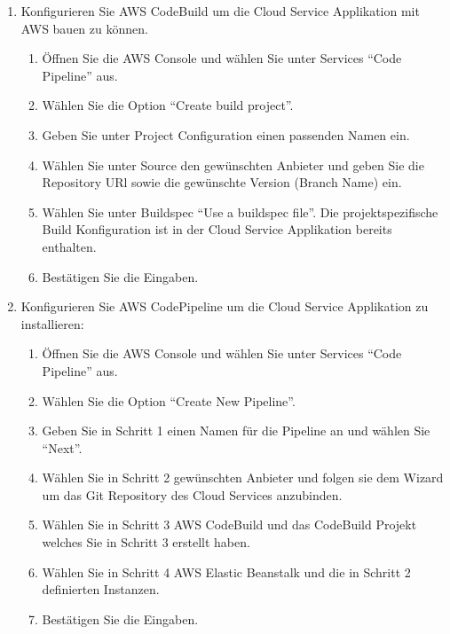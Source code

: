 \begin{enumerate}
\begin{enumerate}
        \item Name: FCM\_CREDENTIALS, Wert: Firebase Credentials mit Base 64 Encoded\footnote{Siehe Installationsanleitung Firebase Messaging}
        \item Name: SPRING\_PROFILES\_ACTIVE, Wert: aws.
    \end{enumerate}
    \item Konfigurieren Sie AWS CodeBuild um die Cloud Service Applikation mit AWS bauen zu können.
    \begin{enumerate}
        \item Öffnen Sie die AWS Console und wählen Sie unter Services ``Code Pipeline'' aus.
        \item Wählen Sie die Option ``Create build project''.
        \item Geben Sie unter Project Configuration einen passenden Namen ein.
        \item Wählen Sie unter Source den gewünschten Anbieter und geben Sie die Repository URl sowie die gewünschte Version (Branch Name) ein.
        \item Wählen Sie unter Buildspec ``Use a buildspec file''. Die projektspezifische Build Konfiguration ist in der Cloud Service Applikation bereits enthalten.
        \item Bestätigen Sie die Eingaben.
    \end{enumerate}
    \item Konfigurieren Sie AWS CodePipeline um die Cloud Service Applikation zu installieren:
    \begin{enumerate}
        \item Öffnen Sie die AWS Console und wählen Sie unter Services ``Code Pipeline'' aus.
        \item Wählen Sie die Option ``Create New Pipeline''.
        \item Geben Sie in Schritt 1 einen Namen für die Pipeline an und wählen Sie ``Next''.
        \item Wählen Sie in Schritt 2 gewünschten Anbieter und folgen sie dem Wizard um das Git Repository des Cloud Services anzubinden.
        \item Wählen Sie in Schritt 3 AWS CodeBuild und das CodeBuild Projekt welches Sie in Schritt 3 erstellt haben.
        \item Wählen Sie in Schritt 4 AWS Elastic Beanstalk und die in Schritt 2 definierten Instanzen.
        \item Bestätigen Sie die Eingaben.
    \end{enumerate}

\end{enumerate}
